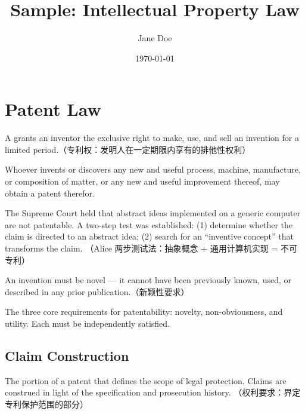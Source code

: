 \documentclass{lexnote}
\title{Sample: Intellectual Property Law}
\author{Jane Doe}
\date{\today}
\begin{document}
\maketitle
\tableofcontents

\section{Patent Law}

A  grants an inventor the exclusive right to make, use, and sell an invention for a limited period.（专利权：发明人在一定期限内享有的排他性权利）

\begin{statute}
  Whoever invents or discovers any new and useful process, machine,
  manufacture, or composition of matter, or any new and useful
  improvement thereof, may obtain a patent therefor.
\end{statute}

\begin{case}
  The Supreme Court held that abstract ideas implemented on a generic
  computer are not patentable. A two-step test was established:
  (1) determine whether the claim is directed to an abstract idea;
  (2) search for an ``inventive concept'' that transforms the claim.
  （Alice 两步测试法：抽象概念 + 通用计算机实现 = 不可专利）
\end{case}

\begin{rul}
  An invention must be novel --- it cannot have been previously known,
  used, or described in any prior publication.（新颖性要求）
\end{rul}

\begin{notebox}[Review]
  The three core requirements for patentability: novelty, non-obviousness,
  and utility. Each must be independently satisfied.
\end{notebox}

\subsection{Claim Construction}

\begin{defbox}[Claim]
  The portion of a patent that defines the scope of legal protection.
  Claims are construed in light of the specification and prosecution history.
  （权利要求：界定专利保护范围的部分）
\end{defbox}
\end{document}
